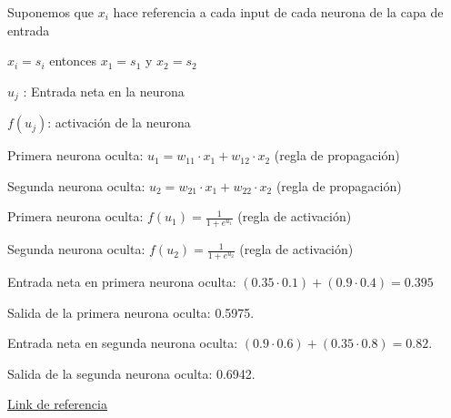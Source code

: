 \documentclass[12pt, letterpaper]{article}
\begin{document}
Suponemos que $x_i$ hace referencia a cada input de cada neurona de la capa de entrada 
\begin{center}
    $x_i=s_i$ entonces $x_1=s_1$ y $x_2=s_2$
\end{center}
\begin{center}
    $u_j$ : Entrada neta en la neurona 
\end{center}
\begin{center}
    $f(u_j)$: activación de la neurona
\end{center}
\begin{center}
    Primera neurona oculta: $u_1 = w_{11} \cdot x_1 + w_{12} \cdot x_2$ (regla de propagación)
\end{center}
\begin{center}
    Segunda neurona oculta: $u_2 = w_{21} \cdot x_1 + w_{22} \cdot x_2$ (regla de propagación)
\end{center}
\begin{center}
    Primera neurona oculta: $f(u_1)=\frac{1}{1+e^{u_1}}$ (regla de activación)
\end{center}
\begin{center}
    Segunda neurona oculta: $f(u_2)=\frac{1}{1+e^{u_2}}$ (regla de activación)
\end{center}
\begin{center}
    Entrada neta en primera neurona oculta: $(0.35 \cdot 0.1) + (0.9 \cdot 0.4) = 0.395$
\end{center}
\begin{center}
    Salida de la primera neurona oculta: 0.5975.
\end{center}
\begin{center}
    Entrada neta en segunda neurona oculta: $(0.9 \cdot 0.6) + (0.35 \cdot 0.8) = 0.82.$
\end{center}
\begin{center}
    Salida de la segunda neurona oculta: 0.6942.
\end{center}

\href{https://mattmazur.com/2015/03/17/a-step-by-step-backpropagation-example/}{Link de referencia}
\end{document}
